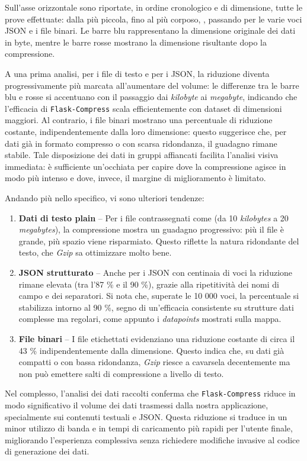 Sull'asse orizzontale sono riportate, in ordine cronologico e di dimensione, tutte
le prove effettuate: dalla più piccola,  fino al più corposo, ,
passando per le varie voci JSON e i file binari. Le barre blu rappresentano la
dimensione originale dei dati in byte, mentre le barre rosse mostrano la dimensione
risultante dopo la compressione.

A una prima analisi, per i file di testo e per i JSON, la riduzione diventa progressivamente
più marcata all'aumentare del volume: le differenze tra le barre blu e rosse si
accentuano con il passaggio dai \textit{kilobyte} ai \textit{megabyte}, indicando
che l'efficacia di \texttt{Flask-Compress} scala efficientemente con dataset di
dimensioni maggiori. Al contrario, i file binari mostrano una percentuale di
riduzione costante, indipendentemente dalla loro dimensione: questo suggerisce
che, per dati già in formato compresso o con scarsa ridondanza, il guadagno
rimane stabile. Tale disposizione dei dati in gruppi affiancati facilita l'analisi
visiva immediata: è sufficiente un'occhiata per capire dove la compressione
agisce in modo più intenso e dove, invece, il margine di miglioramento è
limitato.

Andando più nello specifico, vi sono ulteriori tendenze:

\begin{enumerate}
  \item \textbf{Dati di testo plain} – Per i file contrassegnati come 
    (da 10 \textit{kilobytes} a 20 \textit{megabytes}), la compressione mostra
    un guadagno progressivo: più il file è grande, più spazio viene risparmiato.
    Questo riflette la natura ridondante del testo, che \textit{Gzip} sa ottimizzare
    molto bene.

  \item \textbf{JSON strutturato} – Anche per i JSON con centinaia di voci la
    riduzione rimane elevata (tra l'87 \% e il 90 \%), grazie alla ripetitività dei
    nomi di campo e dei separatori. Si nota che, superate le 10 000 voci, la
    percentuale si stabilizza intorno al 90 \%, segno di un'efficacia consistente
    su strutture dati complesse ma regolari, come appunto i \textit{datapoints} mostrati
    sulla mappa.

  \item \textbf{File binari} – I file etichettati  evidenziano una riduzione
    costante di circa il 43 \% indipendentemente dalla dimensione. Questo indica
    che, su dati già compatti o con bassa ridondanza, \textit{Gzip} riesce a cavarsela
    decentemente ma non può emettere salti di compressione a livello di testo.
\end{enumerate}

\noindent
Nel complesso, l'analisi dei dati raccolti conferma che \texttt{Flask-Compress}
riduce in modo significativo il volume dei dati trasmessi dalla nostra
applicazione, specialmente sui contenuti testuali e JSON. Questa riduzione si
traduce in un minor utilizzo di banda e in tempi di caricamento più rapidi per l'utente
finale, migliorando l'esperienza complessiva senza richiedere modifiche invasive
al codice di generazione dei dati.

